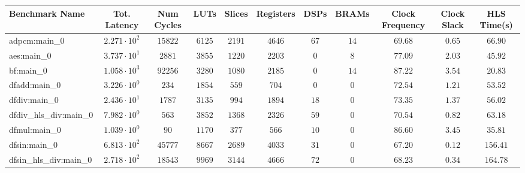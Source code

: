 \begin{tabular}{|l|c|c|c|c|c|c|c|c|c|c|}
\hline
Benchmark Name          & Tot. Latency           & Num Cycles & LUTs      & Slices    & Registers & DSPs    & BRAMs   & Clock Frequency & Clock Slack & HLS Time(s) \\
\hline
adpcm:main\_0           & $ 2.271 \cdot 10^{2} $ & $ 15822  $ & $ 6125  $ & $ 2191  $ & $ 4646  $ & $ 67  $ & $ 14  $ & $ 69.68       $ & $ 0.65    $ & $ 66.90   $ \\
aes:main\_0             & $ 3.737 \cdot 10^{1} $ & $ 2881   $ & $ 3855  $ & $ 1220  $ & $ 2203  $ & $ 0   $ & $ 8   $ & $ 77.09       $ & $ 2.03    $ & $ 45.92   $ \\
bf:main\_0              & $ 1.058 \cdot 10^{3} $ & $ 92256  $ & $ 3280  $ & $ 1080  $ & $ 2185  $ & $ 0   $ & $ 14  $ & $ 87.22       $ & $ 3.54    $ & $ 20.83   $ \\
dfadd:main\_0           & $ 3.226 \cdot 10^{0} $ & $ 234    $ & $ 1854  $ & $ 559   $ & $ 704   $ & $ 0   $ & $ 0   $ & $ 72.54       $ & $ 1.21    $ & $ 53.52   $ \\
dfdiv:main\_0           & $ 2.436 \cdot 10^{1} $ & $ 1787   $ & $ 3135  $ & $ 994   $ & $ 1894  $ & $ 18  $ & $ 0   $ & $ 73.35       $ & $ 1.37    $ & $ 56.02   $ \\
dfdiv\_hls\_div:main\_0 & $ 7.982 \cdot 10^{0} $ & $ 563    $ & $ 3852  $ & $ 1368  $ & $ 2326  $ & $ 59  $ & $ 0   $ & $ 70.54       $ & $ 0.82    $ & $ 63.18   $ \\
dfmul:main\_0           & $ 1.039 \cdot 10^{0} $ & $ 90     $ & $ 1170  $ & $ 377   $ & $ 566   $ & $ 10  $ & $ 0   $ & $ 86.60       $ & $ 3.45    $ & $ 35.81   $ \\
dfsin:main\_0           & $ 6.813 \cdot 10^{2} $ & $ 45777  $ & $ 8667  $ & $ 2689  $ & $ 4033  $ & $ 31  $ & $ 0   $ & $ 67.20       $ & $ 0.12    $ & $ 156.41  $ \\
dfsin\_hls\_div:main\_0 & $ 2.718 \cdot 10^{2} $ & $ 18543  $ & $ 9969  $ & $ 3144  $ & $ 4666  $ & $ 72  $ & $ 0   $ & $ 68.23       $ & $ 0.34    $ & $ 164.78  $ \\

\end{tabular}
